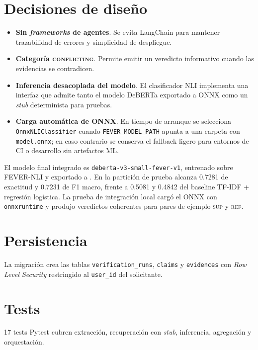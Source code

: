 \section{Decisiones de diseño}

\begin{itemize}[leftmargin=*,itemsep=0.2em]
  \item \textbf{Sin \emph{frameworks} de agentes}. Se evita LangChain
        para mantener trazabilidad de errores y simplicidad de
        despliegue.
  \item \textbf{Categoría \textsc{conflicting}}. Permite emitir un
        veredicto informativo cuando las evidencias se contradicen.
  \item \textbf{Inferencia desacoplada del modelo}. El clasificador
        NLI implementa una interfaz que admite tanto el modelo
        DeBERTa exportado a ONNX como un \emph{stub} determinista para
        pruebas.
      \item \textbf{Carga automática de ONNX}. En tiempo de arranque se
                        selecciona \texttt{OnnxNLIClassifier} cuando
                        \texttt{FEVER\_MODEL\_PATH} apunta a una carpeta con
                        \texttt{model.onnx}; en caso contrario se conserva el fallback
                        ligero para entornos de CI o desarrollo sin artefactos ML.
\end{itemize}

El modelo final integrado es \texttt{deberta-v3-small-fever-v1},
entrenado sobre FEVER-NLI y exportado a
. En la partición de
prueba alcanza 0.7281 de exactitud y 0.7231 de F1 macro, frente a
0.5081 y 0.4842 del baseline TF-IDF + regresión logística. La prueba de
integración local cargó el ONNX con \texttt{onnxruntime} y produjo
veredictos coherentes para pares de ejemplo \textsc{sup} y
\textsc{ref}.

\section{Persistencia}

La migración  crea las tablas
\texttt{verification\_runs}, \texttt{claims} y \texttt{evidences} con
\emph{Row Level Security} restringido al \texttt{user\_id} del
solicitante.

\section{Tests}

17 tests Pytest cubren extracción, recuperación con \emph{stub},
inferencia, agregación y orquestación.
